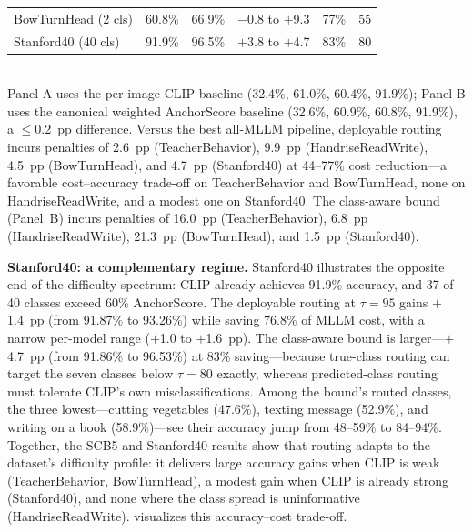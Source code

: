 \documentclass[a4paper,fleqn]{cas-sc}
\begin{document}
\begin{table}[t]
\begin{tabular}{lccccc}
BowTurnHead (2 cls) & 60.8\% & 66.9\% & $-$0.8 to $+$9.3 & 77\% & 55 \\
Stanford40 (40 cls) & 91.9\% & 96.5\% & $+$3.8 to $+$4.7 & 83\% & 80 \\
\bottomrule
\end{tabular}
\\[2pt]
\footnotesize{Panel A uses the per-image CLIP baseline (32.4\%, 61.0\%, 60.4\%, 91.9\%); Panel B uses the canonical weighted AnchorScore baseline (32.6\%, 60.9\%, 60.8\%, 91.9\%), a $\leq$0.2~pp difference. Versus the best all-MLLM pipeline, deployable routing incurs penalties of 2.6~pp (TeacherBehavior), 9.9~pp (HandriseReadWrite), 4.5~pp (BowTurnHead), and 4.7~pp (Stanford40) at 44--77\% cost reduction---a favorable cost--accuracy trade-off on TeacherBehavior and BowTurnHead, none on HandriseReadWrite, and a modest one on Stanford40. The class-aware bound (Panel~B) incurs penalties of 16.0~pp (TeacherBehavior), 6.8~pp (HandriseReadWrite), 21.3~pp (BowTurnHead), and 1.5~pp (Stanford40).}
\end{table}

\noindent\textbf{Stanford40: a complementary regime.} Stanford40 illustrates the opposite end of the difficulty spectrum: CLIP already achieves 91.9\% accuracy, and 37 of 40 classes exceed 60\% AnchorScore. The deployable routing at $\tau=95$ gains $+$1.4~pp (from 91.87\% to 93.26\%) while saving 76.8\% of MLLM cost, with a narrow per-model range ($+$1.0 to $+$1.6~pp). The class-aware bound is larger---$+$4.7~pp (from 91.86\% to 96.53\%) at 83\% saving---because true-class routing can target the seven classes below $\tau=80$ exactly, whereas predicted-class routing must tolerate CLIP's own misclassifications. Among the bound's routed classes, the three lowest---cutting vegetables (47.6\%), texting message (52.9\%), and writing on a book (58.9\%)---see their accuracy jump from 48--59\% to 84--94\%. Together, the SCB5 and Stanford40 results show that routing adapts to the dataset's difficulty profile: it delivers large accuracy gains when CLIP is weak (TeacherBehavior, BowTurnHead), a modest gain when CLIP is already strong (Stanford40), and none where the class spread is uninformative (HandriseReadWrite).  visualizes this accuracy--cost trade-off.
\end{document}
